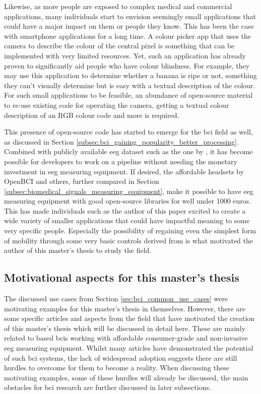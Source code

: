 Likewise, as more people are exposed to complex medical and commercial applications, many individuals start to envision seemingly small applications that could have a major impact on them or people they know.
This has been the case with smartphone applications for a long time.
A colour picker app that uses the camera to describe the colour of the central pixel is something that can be implemented with very limited resources.
Yet, such an application has already proven to significantly aid people who have colour blindness.
For example, they may use this application to determine whether a banana is ripe or not, something they can't visually determine but is easy with a textual description of the colour.
For such small applications to be feasible, an abundance of open-source material to re-use existing code for operating the camera, getting a textual colour description of an RGB colour code and more is required.

This presence of open-source code has started to emerge for the \gls{bci} field as well, as discussed in Section \ref{subsec:bci_gaining_popularity_better_processing}.
Combined with publicly available \gls{eeg} dataset such as the one by \citet{eeg_data}, it has become possible for developers to work on a pipeline without needing the monetary investment in \gls{eeg} measuring equipment.
If desired, the affordable headsets by OpenBCI and others, further compared in Section \ref{subsec:biomedical_signals_measuring_equipment}, make it possible to have \gls{eeg} measuring equipment with good open-source libraries for well under 1000 euros.
This has made individuals such as the author of this paper excited to create a wide variety of smaller applications that could have impactful meaning to some very specific people.
Especially the possibility of regaining even the simplest form of mobility through some very basic controls derived from  is what motivated the author of this master's thesis to study the field.



\subsection{Motivational aspects for this master's thesis}
\label{subsec:bci_opportunities_obstacles_motivating_examples} 

The discussed use cases from Section \ref{sec:bci_common_use_cases} were motivating examples for this master's thesis in themselves.
However, there are some specific articles and aspects from the field that have motivated the creation of this master's thesis which will be discussed in detail here.
These are mainly related to  based \glspl{bci} working with affordable consumer-grade and non-invasive \gls{eeg} measuring equipment.
Whilst many articles have demonstrated the potential of such \gls{bci} systems, the lack of widespread adoption suggests there are still hurdles to overcome for them to become a reality.
When discussing these motivating examples, some of these hurdles will already be discussed, the main obstacles for \gls{bci} research are further discussed in later subsections.


